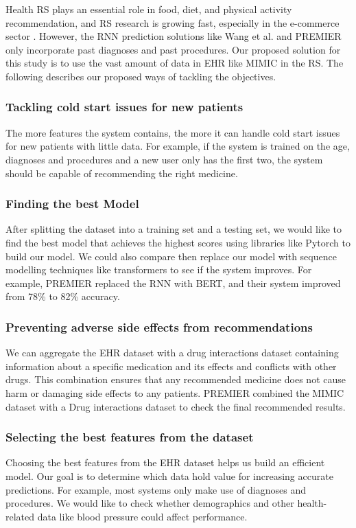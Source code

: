 \label{Proposed}

Health RS plays an essential role in food, diet, and physical activity
recommendation, and RS research is growing fast, especially in the e-commerce
sector \cite{Tran2021b}. However, the RNN prediction solutions
like Wang et al. \cite{Wang} and PREMIER \cite{Bhoi2021} only incorporate past diagnoses and past
procedures. Our proposed solution for this study is to use the vast amount of
data in EHR like MIMIC in the RS.  The following describes our proposed ways of
tackling the objectives.


\subsubsection{
    Tackling cold start issues for new patients
}

The more features the system contains, the more it can handle cold start issues
for new patients with little data. For example, if the system is trained on the
age, diagnoses and procedures and a new user only has the first two, the system
should be capable of recommending the right medicine. 

\subsubsection{
Finding the best Model
}
After splitting the dataset into a training set and a
testing set, we would like to find the best model that
achieves the highest scores using libraries like Pytorch
to build our model. We could also compare then replace
our model with sequence modelling techniques like
transformers to see if the system improves. For example,
PREMIER \cite{Bhoi2021} replaced the RNN with BERT, and
their system improved from 78\% to 82\% accuracy.

\subsubsection{
    Preventing adverse side effects from recommendations
}
We can aggregate the EHR dataset with a drug interactions dataset containing
information about a specific medication and its effects and conflicts with
other drugs. This combination ensures that any recommended medicine does not
cause harm or damaging side effects to any patients.
PREMIER \cite{Bhoi2021} combined the MIMIC dataset with a
Drug interactions dataset to check the final recommended
results.

\subsubsection{
    Selecting the best features from the dataset
}
Choosing the best features from the EHR dataset helps us build an efficient
model. Our goal is to determine which data hold value for increasing accurate
predictions. For example, most systems only make use of
diagnoses and procedures. We would like to check whether
demographics and other health-related data like blood
pressure could affect performance.

